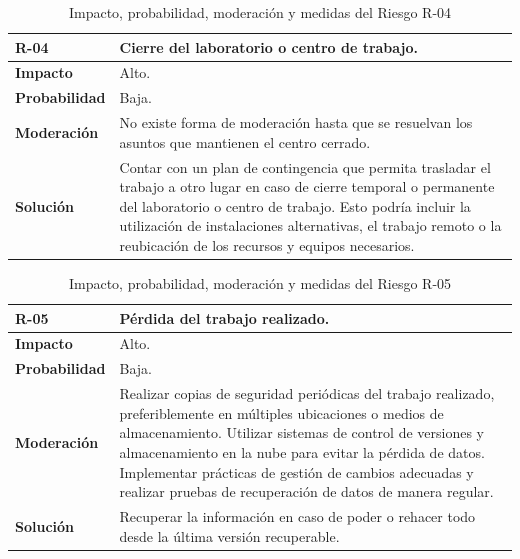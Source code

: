 \begin{table}[htbp]
\begin{center}
\begin{tabular}{|l|p{12cm}|}
\hline
\textbf{R-04} & Cierre del laboratorio o centro de trabajo. \\ \hline
\textbf{Impacto} & Alto. \\ \hline
\textbf{Probabilidad} & Baja. \\ \hline
\textbf{Moderación} & No existe forma de moderación hasta que se resuelvan los asuntos que mantienen el centro cerrado. \\ \hline
\textbf{Solución} & Contar con un plan de contingencia que permita trasladar el trabajo a otro lugar en caso de cierre temporal o permanente del laboratorio o centro de trabajo. Esto podría incluir la utilización de instalaciones alternativas, el trabajo remoto o la reubicación de los recursos y equipos necesarios.\\ \hline
\end{tabular}
\caption[Riesgo R-04]{Impacto, probabilidad, moderación y medidas del Riesgo R-04}
\label{tabla:r-04}
\end{center}
\end{table} 

\begin{table}[htbp]
\begin{center}
\begin{tabular}{|l|p{12cm}|}
\hline
\textbf{R-05} & Pérdida del trabajo realizado. \\ \hline
\textbf{Impacto} & Alto. \\ \hline
\textbf{Probabilidad} & Baja. \\ \hline
\textbf{Moderación} & Realizar copias de seguridad periódicas del trabajo realizado, preferiblemente en múltiples ubicaciones o medios de almacenamiento. Utilizar sistemas de control de versiones y almacenamiento en la nube para evitar la pérdida de datos. Implementar prácticas de gestión de cambios adecuadas y realizar pruebas de recuperación de datos de manera regular. \\ \hline
\textbf{Solución} & Recuperar la información en caso de poder o rehacer todo desde la última versión recuperable.\\ \hline
\end{tabular}
\caption[Riesgo R-05]{Impacto, probabilidad, moderación y medidas del Riesgo R-05}
\label{tabla:r-05}
\end{center}
\end{table} 
 
